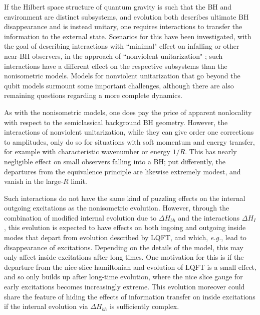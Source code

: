 \documentclass[12pt]{article}
\numberwithin{equation}{section}
\begin{document}
If the Hilbert space structure of quantum gravity is such that the BH and environment are distinct subsystems, and evolution both describes ultimate BH disappearance and is instead unitary, one requires\cite{BHthm} interactions to transfer the information to the external state.  Scenarios for this have been investigated, with the goal of describing interactions with ``minimal" effect on infalling or other near-BH observers, in the approach of 
``nonviolent unitarization" \cite{SGmodels,NVU,NVNL,NVUEFT,NVNLT,BHQU};
such interactions have a different effect on the respective subsystems than the nonisometric models.  
Models for nonviolent unitarization that go beyond the qubit models surmount some important challenges, although there are also remaining questions regarding a more complete dynamics.  

As with the nonisometric models, one does pay the price of apparent nonlocality with respect to the semiclassical background BH geometry.  However, the interactions of nonviolent unitarization, while they can give order one corrections to amplitudes, only do so for situations with soft momentum and energy transfer, for example with characteristic wavenumber or energy $1/R$.  This has nearly negligible effect on small observers falling into a BH; put differently, the departures from the equivalence principle are likewise extremely modest, and vanish in the large-$R$ limit.

Such interactions do not have the same kind of puzzling effects on the internal outgoing excitations as the nonisometric evolution.  However, through the combination of modified internal evolution due to $\Delta H_{bh}$ and the interactions $\Delta H_I$, this evolution is expected to have effects on  both ingoing and outgoing inside modes that depart from evolution described by LQFT, and which, {\it e.g.}, lead to disappearance of excitations.  Depending on the details of the model, this may only affect inside excitations after long times.  One motivation for this is if the departure from the nice-slice hamiltonian and evolution of LQFT is a small effect, and so only builds up after long-time evolution, where the nice slice gauge for early excitations becomes increasingly extreme.
This evolution moreover could share the feature of hiding the effects of information transfer\cite{AEHPV} on inside excitations if the internal evolution via $\Delta H_{bh}$ is sufficiently complex.   
\end{document}
